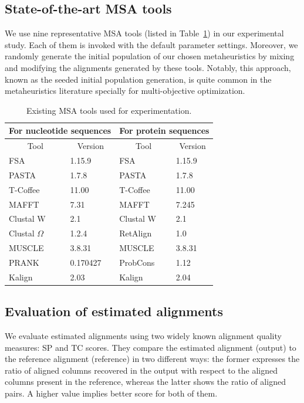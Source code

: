 \subsection{State-of-the-art MSA tools}
 We use nine representative MSA tools (listed in Table~\ref{tab:msa_tools}) in our experimental study. Each of them is invoked with the default parameter settings. Moreover, we randomly generate the initial population of our chosen metaheuristics by mixing and modifying the alignments generated by these tools. Notably, this approach,
known as the seeded initial population generation, is quite common in the metaheuristics literature specially for multi-objective optimization.
 
 \begin{table}[htbp]
\centering
	\caption{ Existing MSA tools used for experimentation.}
	\begin{tabular}{|l|l||l|l|}
		\hline
		\multicolumn{2}{|c||}{For nucleotide sequences} & \multicolumn{2}{c|}{For protein sequences} \\
		\hline
		\multicolumn{1}{|c|}{Tool} & \multicolumn{1}{c||}{Version} & \multicolumn{1}{c|}{Tool} & \multicolumn{1}{c|}{Version} \\
		\hline
		FSA~\citep{bradley2009fast} & 1.15.9 & FSA   & 1.15.9 \\
		\hline
		PASTA~\citep{mirarab2015pasta} & 1.7.8 & PASTA & 1.7.8 \\
		\hline
		T-Coffee~\citep{notredame2000t} & 11.00 & T-Coffee & 11.00 \\
		\hline
		MAFFT~\citep{katoh2002mafft} & 7.31  & MAFFT & 7.245 \\
		\hline
		Clustal W~\citep{thompson1994clustal} & 2.1   & Clustal W & 2.1 \\
		\hline
		Clustal $ \Omega $~\citep{sievers2011fast} & 1.2.4 & RetAlign~\citep{szabo2010reticular} & 1.0 \\
		\hline
		MUSCLE~\citep{edgar2004muscle} & 3.8.31 & MUSCLE & 3.8.31 \\
		\hline
		PRANK~\citep{loytynoja2005algorithm} & 0.170427 & ProbCons~\citep{do2005probcons} & 1.12 \\
		\hline
		Kalign~\citep{lassmann2008kalign2} & 2.03  & Kalign & 2.04 \\
		\hline
	\end{tabular}\label{tab:msa_tools}\end{table}

\subsection{Evaluation of estimated alignments}
\label{sec:msa_eval}
We evaluate estimated alignments using two widely known alignment quality measures: SP and TC scores. They compare the estimated alignment (output) to the reference alignment (reference) in two different ways: the former expresses the ratio of aligned columns recovered in the output with respect to the aligned columns present in the reference, whereas the latter shows the ratio of aligned pairs. 
A higher value implies better score for both of them.

